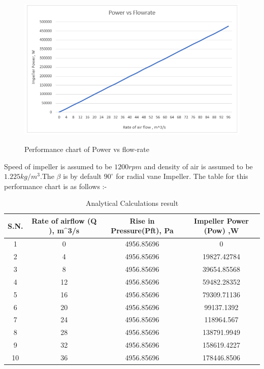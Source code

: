 \documentclass[11pt]{article}
\begin{document}
\begin{figure}[h!]
\centering
\includegraphics[scale=1]{povsq.png}\\
\caption{Performance chart of Power vs flow-rate}
\end{figure}
Speed of impeller is assumed to be $1200 rpm$ and density of air is assumed to be $1.225 kg/m^3$.The $\beta$ is by default $90^\circ$ for radial vane Impeller.
The table for this performance chart is as follows :- \\
\begin{table}[]
\centering
\begin{tabular}{|c|c|c|c|}
\hline
S.N. & Rate of airflow (Q ), m\textasciicircum{}3/s & Rise in Pressure(Pft), Pa & Impeller Power (Pow) ,W \\ \hline
1    & 0                                            & 4956.85696                & 0                       \\ \hline
2    & 4                                            & 4956.85696                & 19827.42784             \\ \hline
3    & 8                                            & 4956.85696                & 39654.85568             \\ \hline
4    & 12                                           & 4956.85696                & 59482.28352             \\ \hline
5    & 16                                           & 4956.85696                & 79309.71136             \\ \hline
6    & 20                                           & 4956.85696                & 99137.1392              \\ \hline
7    & 24                                           & 4956.85696                & 118964.567              \\ \hline
8    & 28                                           & 4956.85696                & 138791.9949             \\ \hline
9    & 32                                           & 4956.85696                & 158619.4227             \\ \hline
10   & 36                                           & 4956.85696                & 178446.8506             \\ \hline
\end{tabular}
\caption{Analytical Calculations result}
\end{table}
\end{document}
